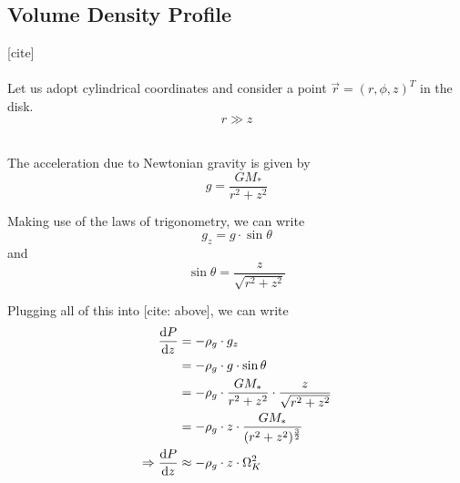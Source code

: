     \newpage\subsection{Volume Density Profile}

         [cite] \\
         \\

        Let us adopt cylindrical coordinates and consider a point $\vec r=(r,\phi,z)^T$ in the 
        disk. \\  %

        \begin{equation*}
            r\gg z 
        \end{equation*}

         \\
        

        The acceleration due to Newtonian gravity is given by
        \begin{equation}
            g=\frac{GM_*}{r^2+z^2}
        \end{equation}

        Making use of the laws of trigonometry, we can write
        \begin{equation}
            g_z=g\cdot\sin\theta
        \end{equation}
        and
        \begin{equation}
            \sin\theta=\frac{z}{\sqrt{r^2+z^2}}
        \end{equation}

        Plugging all of this into [cite: above], we can write
        \begin{align}
            \frac{\text{d} P}{\text{d} z}
                &= -\rho_g \cdot g_z \\
                &= -\rho_g \cdot g \cdot \sin\theta \\
                &= -\rho_g \cdot \frac{GM_*}{r^2+z^2} \cdot\frac{z}{\sqrt{r^2+z^2}} \\
                &= -\rho_g \cdot z \cdot\frac{GM_*}{ (r^2+z^2)^{\frac{3}{2}} } \\
            \Rightarrow
            \frac{\text{d} P}{\text{d} z}
                &\approx -\rho_g \cdot z \cdot \Omega_K^2
        \end{align}

